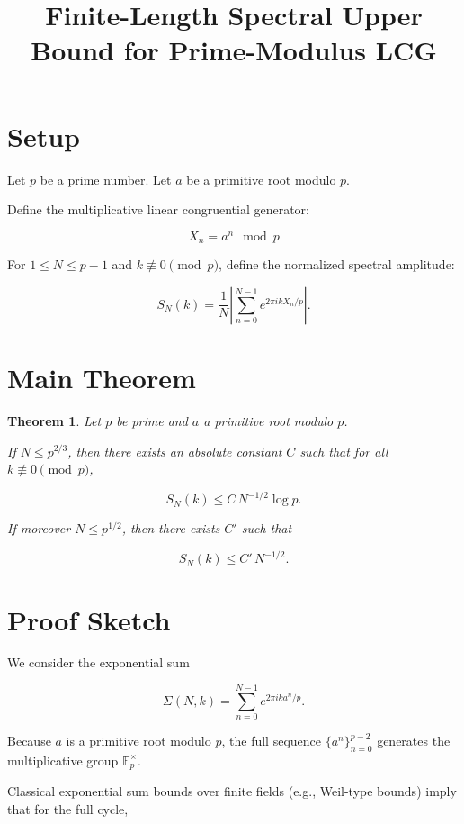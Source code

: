 \documentclass[11pt]{article}
\newtheorem{theorem}{Theorem}
\begin{document}
\title{Finite-Length Spectral Upper Bound for Prime-Modulus LCG}
\author{}
\date{}
\maketitle

\section*{Setup}

Let $p$ be a prime number.
Let $a$ be a primitive root modulo $p$.

Define the multiplicative linear congruential generator:

\[
X_n = a^n \mod p
\]

For $1 \le N \le p-1$ and $k \not\equiv 0 \pmod p$,
define the normalized spectral amplitude:

\[
S_N(k) =
\frac{1}{N}
\left|
\sum_{n=0}^{N-1}
e^{2\pi i k X_n / p}
\right|.
\]

\section*{Main Theorem}

\begin{theorem}
Let $p$ be prime and $a$ a primitive root modulo $p$.

If $N \le p^{2/3}$, then there exists an absolute constant $C$
such that for all $k \not\equiv 0 \pmod p$,

\[
S_N(k) \le C \, N^{-1/2} \log p.
\]

If moreover $N \le p^{1/2}$, then there exists $C'$ such that

\[
S_N(k) \le C' \, N^{-1/2}.
\]
\end{theorem}

\section*{Proof Sketch}

We consider the exponential sum

\[
\Sigma(N,k) =
\sum_{n=0}^{N-1}
e^{2\pi i k a^n / p}.
\]

Because $a$ is a primitive root modulo $p$,
the full sequence $\{a^n \}_{n=0}^{p-2}$ generates
the multiplicative group $\mathbb{F}_p^\times$.

Classical exponential sum bounds over finite fields
(e.g., Weil-type bounds) imply that for the full cycle,
\end{document}
